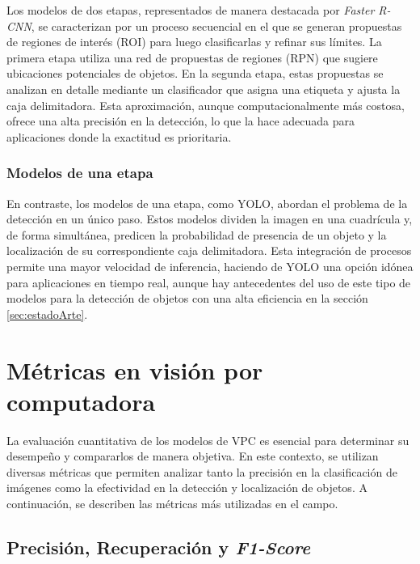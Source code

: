 Los modelos de dos etapas, representados de manera destacada por \textit{Faster R-CNN}, se caracterizan por un proceso secuencial en el que se generan propuestas de regiones de interés (ROI) para luego clasificarlas y refinar sus límites. La primera etapa utiliza una red de propuestas de regiones (RPN) que sugiere ubicaciones potenciales de objetos. En la segunda etapa, estas propuestas se analizan en detalle mediante un clasificador que asigna una etiqueta y ajusta la caja delimitadora. Esta aproximación, aunque computacionalmente más costosa, ofrece una alta precisión en la detección, lo que la hace adecuada para aplicaciones donde la exactitud es prioritaria.

\subsubsection{Modelos de una etapa}

En contraste, los modelos de una etapa, como YOLO, abordan el problema de la detección en un único paso. Estos modelos dividen la imagen en una cuadrícula y, de forma simultánea, predicen la probabilidad de presencia de un objeto y la localización de su correspondiente caja delimitadora. Esta integración de procesos permite una mayor velocidad de inferencia, haciendo de YOLO una opción idónea para aplicaciones en tiempo real, aunque hay antecedentes del uso de este tipo de modelos para la detección de objetos con una alta eficiencia en la sección \ref{sec:estadoArte}.


\section{Métricas en visión por computadora} \label{sec:metricasVisPC}

La evaluación cuantitativa de los modelos de VPC es esencial para determinar su desempeño y compararlos de manera objetiva. En este contexto, se utilizan diversas métricas que permiten analizar tanto la precisión en la clasificación de imágenes como la efectividad en la detección y localización de objetos. A continuación, se describen las métricas más utilizadas en el campo.

\subsection{Precisión, Recuperación y \textit{F1-Score}}


